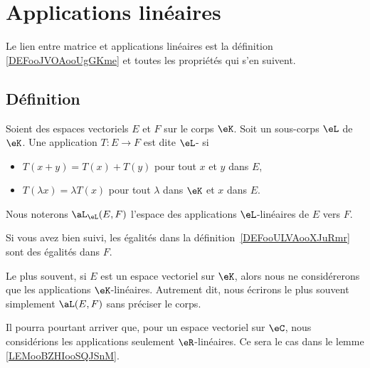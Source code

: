\section{Applications linéaires}

Le lien entre matrice et applications linéaires est la définition \ref{DEFooJVOAooUgGKme} et toutes les propriétés qui s'en suivent.

\subsection{Définition}

\begin{definition}      \label{DEFooULVAooXJuRmr}
	Soient des espaces vectoriels \( E \) et \( F\) sur le corps \( \eK\). Soit un sous-corps \( \eL\) de \( \eK\). Une application \( T\colon E\to F\) est dite \( \eL\)- si
	\begin{itemize}
		\item \( T(x+y)=T(x)+T(y)\) pour tout \( x\) et \( y\) dans \( E\),
		\item \( T(\lambda x)=\lambda T(x)\) pour tout \( \lambda\) dans \( \eK\) et \( x\) dans \( E\).
	\end{itemize}
	Nous noterons \( \aL_{\eL}(E,F)\) l'espace des applications \( \eL\)-linéaires de \( E\) vers \( F\).
\end{definition}
Si vous avez bien suivi, les égalités dans la définition~\ref{DEFooULVAooXJuRmr} sont des égalités dans \( F\).

\begin{normaltext}
	Le plus souvent, si \( E\) est un espace vectoriel sur \(\eK \), alors nous ne considérerons que les applications \( \eK\)-linéaires. Autrement dit, nous écrirons le plus souvent simplement \( \aL(E,F)\) sans préciser le corps.

	Il pourra pourtant arriver que, pour un espace vectoriel sur \( \eC\), nous considérions les applications seulement \( \eR\)-linéaires. Ce sera le cas dans le lemme \ref{LEMooBZHIooSQJSnM}.
\end{normaltext}

